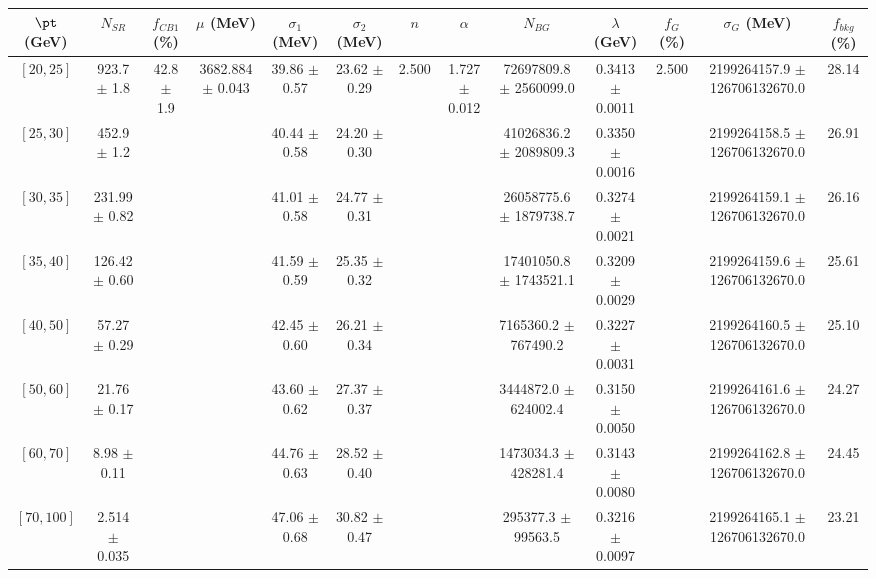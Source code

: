 \begin{tabular}{c||c|c|c|c|c|c|c|c|c|c|c||c}
$\pt$ (GeV) & $N_{SR}$ & $f_{CB1}$ (\%) & $\mu$ (MeV) & $\sigma_1$ (MeV) & $\sigma_2$ (MeV) & $n$ & $\alpha$ & $N_{BG}$ & $\lambda$ (GeV) & $f_G$ (\%) & $\sigma_G$ (MeV) & $f_{bkg}$ (\%) \\
\hline
$[20, 25]$ & 923.7 $\pm$ 1.8 & \multirow{8}{*}{42.8 $\pm$ 1.9} & \multirow{8}{*}{3682.884 $\pm$ 0.043} & 39.86 $\pm$ 0.57 & 23.62 $\pm$ 0.29 & \multirow{8}{*}{2.500} & \multirow{8}{*}{1.727 $\pm$ 0.012} & 72697809.8 $\pm$ 2560099.0 & 0.3413 $\pm$ 0.0011 & \multirow{8}{*}{2.500} & 2199264157.9 $\pm$ 126706132670.0 & 28.14\\
$[25, 30]$ & 452.9 $\pm$ 1.2 &  &  & 40.44 $\pm$ 0.58 & 24.20 $\pm$ 0.30 &  &  & 41026836.2 $\pm$ 2089809.3 & 0.3350 $\pm$ 0.0016 &  & 2199264158.5 $\pm$ 126706132670.0 & 26.91\\
$[30, 35]$ & 231.99 $\pm$ 0.82 &  &  & 41.01 $\pm$ 0.58 & 24.77 $\pm$ 0.31 &  &  & 26058775.6 $\pm$ 1879738.7 & 0.3274 $\pm$ 0.0021 &  & 2199264159.1 $\pm$ 126706132670.0 & 26.16\\
$[35, 40]$ & 126.42 $\pm$ 0.60 &  &  & 41.59 $\pm$ 0.59 & 25.35 $\pm$ 0.32 &  &  & 17401050.8 $\pm$ 1743521.1 & 0.3209 $\pm$ 0.0029 &  & 2199264159.6 $\pm$ 126706132670.0 & 25.61\\
$[40, 50]$ & 57.27 $\pm$ 0.29 &  &  & 42.45 $\pm$ 0.60 & 26.21 $\pm$ 0.34 &  &  & 7165360.2 $\pm$ 767490.2 & 0.3227 $\pm$ 0.0031 &  & 2199264160.5 $\pm$ 126706132670.0 & 25.10\\
$[50, 60]$ & 21.76 $\pm$ 0.17 &  &  & 43.60 $\pm$ 0.62 & 27.37 $\pm$ 0.37 &  &  & 3444872.0 $\pm$ 624002.4 & 0.3150 $\pm$ 0.0050 &  & 2199264161.6 $\pm$ 126706132670.0 & 24.27\\
$[60, 70]$ & 8.98 $\pm$ 0.11 &  &  & 44.76 $\pm$ 0.63 & 28.52 $\pm$ 0.40 &  &  & 1473034.3 $\pm$ 428281.4 & 0.3143 $\pm$ 0.0080 &  & 2199264162.8 $\pm$ 126706132670.0 & 24.45\\
$[70, 100]$ & 2.514 $\pm$ 0.035 &  &  & 47.06 $\pm$ 0.68 & 30.82 $\pm$ 0.47 &  &  & 295377.3 $\pm$ 99563.5 & 0.3216 $\pm$ 0.0097 &  & 2199264165.1 $\pm$ 126706132670.0 & 23.21\\
\end{tabular}
